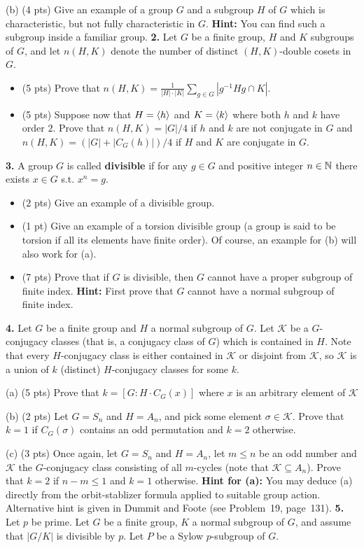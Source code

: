 \documentclass[12pt]{article}
\begin{document}
(b) (4 pts) Give an example of a group $G$ and a subgroup $H$ of $G$ which
is characteristic, but not fully characteristic in $G$. {\bf Hint:} You
can find such a subgroup inside a familiar group.
\skv
{\bf 2.} Let $G$ be a finite group, $H$ and $K$ subgroups of $G$, and
let $n(H,K)$ denote the number of distinct $(H,K)$-double cosets in $G$.
\begin{itemize}
\item[(a)] (5 pts) Prove that $n(H,K)=\frac{1}{|H|\cdot |K|}\sum_{g\in G}|g^{-1}Hg\cap K|.$

\item[(b)] (5 pts) Suppose now that $H={\langle} h{\rangle}$ and $K={\langle} k {\rangle}$ where both $h$ and $k$
have order $2$. Prove that $n(H,K)=|G|/4$ if $h$ and $k$ are not conjugate in $G$
and $n(H,K)=(|G|+|C_{G}(h)|)/4$ if $H$ and $K$ are conjugate in $G$.
\end{itemize}
{\bf 3.} A group $G$ is called {\bf divisible} if for any $g\in G$ and positive
integer $n\in{\mathbb N}$ there exists $x\in G$ s.t. $x^n=g$.
\begin{itemize}
\item[(a)] (2 pts) Give an example of a divisible group.
\item[(b)] (1 pt) Give an example of a torsion divisible group (a group is said to
be torsion if all its elements have finite order). Of course, an example
for (b) will also work for (a).
\item[(c)] (7 pts) Prove that if $G$ is divisible, then $G$ cannot have a proper subgroup
of finite index. {\bf Hint:} First prove that $G$ cannot have a normal
subgroup of finite index.
\end{itemize}
\skv

{\bf 4.} Let $G$ be a finite group and $H$ a normal subgroup of $G$. Let $\mathcal K$ be a $G$-conjugacy classes
(that is, a conjugacy class of $G$) which is contained in $H$. Note that every $H$-conjugacy class
is either contained in $\mathcal K$ or disjoint from $\mathcal K$, so $\mathcal K$ is a union
of $k$ (distinct) $H$-conjugacy classes for some $k$.

(a) (5 pts) Prove that $k=[G: H \cdot C_G(x)]$ where $x$ is an arbitrary element of $\mathcal K$

(b) (2 pts) Let $G=S_n$ and $H=A_n$, and pick some element $\sigma\in \mathcal K$. Prove that $k=1$
if $C_G(\sigma)$ contains an odd permutation and $k=2$ otherwise.

(c) (3 pts) Once again, let $G=S_n$ and $H=A_n$, let $m\leq n$ be an odd number and $\mathcal K$
the $G$-conjugacy class consisting of all $m$-cycles (note that $\mathcal K\subseteq A_n$).
Prove that $k=2$ if $n-m\leq 1$ and $k=1$ otherwise.
\skv
{\bf Hint for (a):} You may deduce (a) directly from the orbit-stablizer formula applied
to suitable group action. Alternative hint is given in Dummit and Foote (see Problem~19, page~131).
\skv
\skv
{\bf 5.} Let $p$ be prime. Let $G$ be a finite group, $K$ a normal subgroup of $G$,
and assume that $|G/K|$ is divisible by $p$. Let $P$ be a Sylow $p$-subgroup of $G$.
\end{document}
